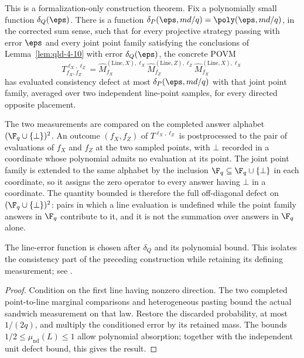 \begin{lemma}
	\label{lem:combined-line-measurement-consistency}
	\leanok
	This is a formalization-only construction theorem. Fix a polynomially small
	function $\delta_Q(\eps)$. There is a function
	$\delta_P(\eps,md/q)=\poly(\eps,md/q)$, in the corrected sum sense,
	such that for every projective strategy passing with error $\eps$ and
	every joint point family satisfying the conclusions of
	Lemma~\ref{lem:qld-4-10} with error $\delta_Q(\eps)$, the concrete POVM
	\[
		T^{\ell_X,\ell_Z}_{f_X,f_Z}
		=\hat M^{(\mathrm{Line},X),\ell_X}_{f_X}
		 \hat M^{(\mathrm{Line},Z),\ell_Z}_{f_Z}
		 \hat M^{(\mathrm{Line},X),\ell_X}_{f_X}
	\]
	has evaluated consistency defect at most $\delta_P(\eps,md/q)$ with that
	joint point family, averaged over two independent line-point samples,
	for every directed opposite placement.

	The two measurements are compared on the completed answer alphabet
	$(\F_q\cup\{\bot\})^2$. An outcome $(f_X,f_Z)$ of $T^{\ell_X,\ell_Z}$ is
	postprocessed to the pair of evaluations of $f_X$ and $f_Z$ at the two
	sampled points, with $\bot$ recorded in a coordinate whose polynomial
	admits no evaluation at its point. The joint point family is extended to
	the same alphabet by the inclusion $\F_q\subseteq\F_q\cup\{\bot\}$ in each
	coordinate, so it assigns the zero operator to every answer having $\bot$
	in a coordinate. The quantity bounded is therefore the full off-diagonal
	defect on $(\F_q\cup\{\bot\})^2$: pairs in which a line evaluation is
	undefined while the point family answers in $\F_q$ contribute to it, and
	it is not the summation over answers in $\F_q$ alone.

	The line-error function is chosen after $\delta_Q$ and its polynomial
	bound. This isolates the consistency part of the preceding construction
	while retaining its defining measurement; see
	\cite{gap:qpbt_subline-claims-line-marginal}.
\end{lemma}
\begin{proof}
	\leanok
	Condition on the first line having nonzero direction. The two completed
	point-to-line marginal comparisons and heterogeneous pasting bound the
	actual sandwich measurement on that law. Restore the discarded probability,
	at most $1/(2q)$, and multiply the conditioned error by its retained mass.
	The bounds $1/2\leq\mu_{\mathrm{nd}}(L)\leq1$ allow polynomial absorption;
	together with the independent unit defect bound, this gives the result.
\end{proof}

